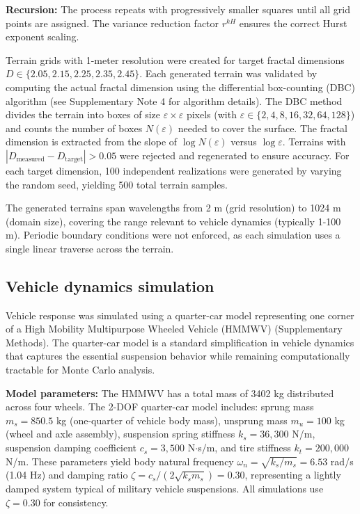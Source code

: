 \documentclass[11pt,letterpaper]{article}
\begin{document}
\textbf{Recursion:} The process repeats with progressively smaller squares until all grid points are assigned. The variance reduction factor $r^{kH}$ ensures the correct Hurst exponent scaling.

Terrain grids with 1-meter resolution were created for target fractal dimensions $D \in \{2.05, 2.15, 2.25, 2.35, 2.45\}$. Each generated terrain was validated by computing the actual fractal dimension using the differential box-counting (DBC) algorithm\cite{Sarkar1994} (see Supplementary Note 4 for algorithm details). The DBC method divides the terrain into boxes of size $\varepsilon \times \varepsilon$ pixels (with $\varepsilon \in \{2, 4, 8, 16, 32, 64, 128\}$) and counts the number of boxes $N(\varepsilon)$ needed to cover the surface. The fractal dimension is extracted from the slope of $\log N(\varepsilon)$ versus $\log \varepsilon$. Terrains with $|D_{\text{measured}} - D_{\text{target}}| > 0.05$ were rejected and regenerated to ensure accuracy. For each target dimension, 100 independent realizations were generated by varying the random seed, yielding 500 total terrain samples.

The generated terrains span wavelengths from 2 m (grid resolution) to 1024 m (domain size), covering the range relevant to vehicle dynamics (typically 1-100 m). Periodic boundary conditions were not enforced, as each simulation uses a single linear traverse across the terrain.

\subsection{Vehicle dynamics simulation}

Vehicle response was simulated using a quarter-car model representing one corner of a High Mobility Multipurpose Wheeled Vehicle (HMMWV) (Supplementary Methods). The quarter-car model is a standard simplification in vehicle dynamics that captures the essential suspension behavior while remaining computationally tractable for Monte Carlo analysis.

\textbf{Model parameters:} The HMMWV has a total mass of 3402 kg distributed across four wheels. The 2-DOF quarter-car model includes: sprung mass $m_s = 850.5$ kg (one-quarter of vehicle body mass), unsprung mass $m_u = 100$ kg (wheel and axle assembly), suspension spring stiffness $k_s = 36,300$ N/m, suspension damping coefficient $c_s = 3,500$ N$\cdot$s/m, and tire stiffness $k_t = 200,000$ N/m. These parameters yield body natural frequency $\omega_n = \sqrt{k_s/m_s} = 6.53$ rad/s (1.04 Hz) and damping ratio $\zeta = c_s/(2\sqrt{k_s m_s}) = 0.30$, representing a lightly damped system typical of military vehicle suspensions. All simulations use $\zeta = 0.30$ for consistency.
\end{document}
